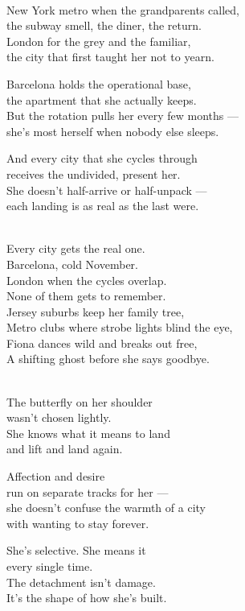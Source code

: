 \begin{lyrics}
\\
New York metro when the grandparents called,\\
the subway smell, the diner, the return.\\
London for the grey and the familiar,\\
the city that first taught her not to yearn.

Barcelona holds the operational base,\\
the apartment that she actually keeps.\\
But the rotation pulls her every few months —\\
she's most herself when nobody else sleeps.

And every city that she cycles through\\
receives the undivided, present her.\\
She doesn't half-arrive or half-unpack —\\
each landing is as real as the last were.

\\
Every city gets the real one.\\
Barcelona, cold November.\\
London when the cycles overlap.\\
None of them gets to remember.\\
Jersey suburbs keep her family tree,\\
Metro clubs where strobe lights blind the eye,\\
Fiona dances wild and breaks out free,\\
A shifting ghost before she says goodbye.

\\
The butterfly on her shoulder\\
wasn't chosen lightly.\\
She knows what it means to land\\
and lift and land again.

Affection and desire\\
run on separate tracks for her —\\
she doesn't confuse the warmth of a city\\
with wanting to stay forever.

She's selective. %
She means it\\
every single time.\\
The detachment isn't damage.\\
It's the shape of how she's built.


\end{lyrics}
